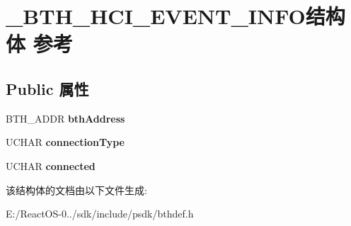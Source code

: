 \hypertarget{struct___b_t_h___h_c_i___e_v_e_n_t___i_n_f_o}{}\section{\+\_\+\+B\+T\+H\+\_\+\+H\+C\+I\+\_\+\+E\+V\+E\+N\+T\+\_\+\+I\+N\+F\+O结构体 参考}
\label{struct___b_t_h___h_c_i___e_v_e_n_t___i_n_f_o}
\subsection*{Public 属性}
\begin{DoxyCompactItemize}
\item 
\mbox{\label{struct___b_t_h___h_c_i___e_v_e_n_t___i_n_f_o_a854793fa3a199a5ee1e4c28bd69a87a8}} 
B\+T\+H\+\_\+\+A\+D\+DR {\bfseries bth\+Address}
\item 
\mbox{\label{struct___b_t_h___h_c_i___e_v_e_n_t___i_n_f_o_a9b54ead5c7e5900e0ada7200b69db5d5}} 
U\+C\+H\+AR {\bfseries connection\+Type}
\item 
\mbox{\label{struct___b_t_h___h_c_i___e_v_e_n_t___i_n_f_o_ab4cefc57ff9d9e17feb21e45c896e3a2}} 
U\+C\+H\+AR {\bfseries connected}
\end{DoxyCompactItemize}


该结构体的文档由以下文件生成\+:\begin{DoxyCompactItemize}
\item 
E\+:/\+React\+O\+S-\/0../sdk/include/psdk/bthdef.\+h\end{DoxyCompactItemize}
